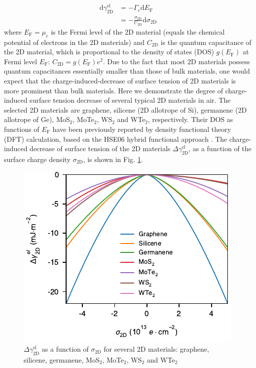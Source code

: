 \documentclass[journal=ancac3,manuscript=article,email=true]{achemso}
\begin{document}
\begin{equation}
\label{eqn:dgamma-QC}
\begin{aligned}
\mathrm{d} \gamma_{\mathrm{2D}}^{\mathrm{el}} &= -\Gamma_{e} \mathrm{d} E_{\mathrm{F}} \\
                                              &= -\frac{\sigma_{\mathrm{2D}}}{C_{\mathrm{2D}}} \mathrm{d}\sigma_{\mathrm{2D}}
\end{aligned}
\end{equation}
where \(E_{\mathrm{F}}=\mu_{e}\) is the Fermi level of the 2D material
(equals the chemical potential of electrons in the 2D materials) and
\(C_{\mathrm{2D}}\) is the quantum capacitance of the 2D material, which
is proportional to the density of states (DOS) \(g(E_{\mathrm{F}})\) at
Fermi level \(E_{\mathrm{F}}\):
\(C_{\mathrm{2D}}=g(E_{\mathrm{F}})e^{2}\). Due to the fact that most 2D
materials possess quantum capacitances essentially smaller than those
of bulk materials, one would expect that the charge-induced-decrease
of surface tension of 2D materials is more prominent than bulk
materials. Here we demonstrate the degree of charge-induced
surface tension decrease of several typical 2D materials in
air. The selected 2D materials are graphene, silicene (2D allotrope
of Si), germanene (2D allotrope of Ge), MoS\(_{\text{2}}\), MoTe\(_{\text{2}}\), WS\(_{\text{2}}\) and
WTe\(_{\text{2}}\), respectively. Their DOS as functions of \(E_{\mathrm{F}}\) have been previously
reported by density functional theory (DFT) calculation, based on the
HSE06 hybrid functional approach \cite{tian_multiscale_2016}. The
charge-induced decrease of surface tension of the 2D materials
\(\Delta \gamma_{\mathrm{2D}}^{\mathrm{el}}\), as a function of the
surface charge density \(\sigma_{\mathrm{2D}}\), is shown in Fig. \ref{fig:dgamma-sigma}.
\begin{figure}[htbp]
\centering
\includegraphics[width=0.95\linewidth]{../img/dgamma-sigma.pdf}
\caption{\label{fig:dgamma-sigma}
\(\Delta \gamma_{\mathrm{2D}}^{\mathrm{el}}\) as a function of \(\sigma_{\mathrm{2D}}\) for several 2D materials: graphene, silicene, germanene, MoS\(_{2}\), MoTe\(_{2}\), WS\(_{2}\) and WTe\(_{2}\)}
\end{figure}
\end{document}
